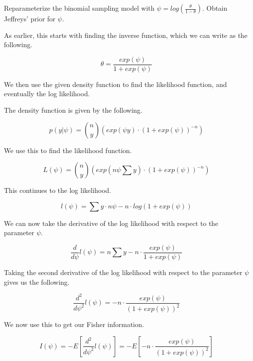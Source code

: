\documentclass[12pt, letterpaper]{article}
\begin{document}
Reparameterize the binomial sampling model with $\psi = log\left(\frac{\theta}{1 - \theta}\right)$. Obtain Jeffreys' prior for $\psi$. 

As earlier, this starts with finding the inverse function, which we can write as the following. 

\begin{equation}
  \theta = \frac{exp(\psi)}{1 + exp(\psi)}
\end{equation} 

We then use the given density function to find the likelihood function, and eventually the log likelihood. 

The density function is given by the following. 

\begin{equation}
  p(y | \psi) = \binom{n}{y}\left(exp(\psi y) \cdot (1 + exp(\psi))^{-n}\right)
\end{equation}

We use this to find the likelihood function. 

\begin{equation}
  L(\psi) = \binom{n}{y}\left(exp(n \psi \sum y) \cdot (1 + exp(\psi))^{-n}\right) 
\end{equation} 

This continues to the log likelihood. 

\begin{equation}
  l(\psi) = \sum y \cdot n \psi - n \cdot log(1 + exp(\psi)) 
\end{equation}

We can now take the derivative of the log likelihood with respect to the parameter $\psi$. 

\begin{equation}
  \frac{d}{d\psi}l(\psi) = n \sum y - n \cdot \frac{exp(\psi)}{1 + exp(\psi)} 
\end{equation} 

Taking the second derivative of the log likelihood with respect to the parameter $\psi$ gives us the following. 

\begin{equation}
  \frac{d^2}{d\psi^2}l(\psi) = -n \cdot \frac{exp(\psi)}{(1 + exp(\psi))^2} 
\end{equation} 

We now use this to get our Fisher information. 

\begin{equation}
  I(\psi) = -E\left[\frac{d^2}{d\psi^2}l(\psi)\right] = -E\left[-n \cdot \frac{exp(\psi)}{(1 + exp(\psi))^2}\right]
\end{equation}
\end{document}
